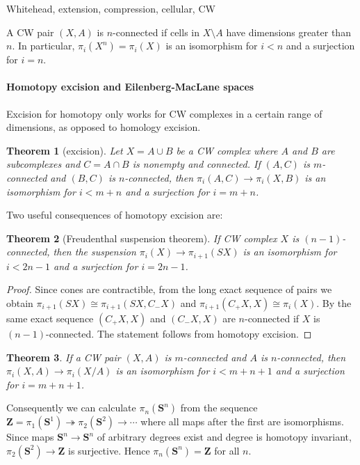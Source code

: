 \documentclass[11pt]{article}
\theoremstyle{definition}
\theoremstyle{plain}
\newtheorem{theorem}{Theorem}[section]
\newcommand{\Z}{\mathbf{Z}}
\newcommand{\1}{\mathbf{1}}
\newcommand{\s}{\mathbf{S}}
\begin{document}
Whitehead, extension, compression, cellular, CW\medbreak

A CW pair $(X,A)$ is $n$-connected if cells in $X\setminus A$ have dimensions greater than $n$. In particular, $\pi_i(X^n)=\pi_i(X)$ is an isomorphism for $i<n$ and a surjection for $i=n$.

\newpage
\paragraph{Homotopy excision and Eilenberg-MacLane spaces} Excision for homotopy only works for CW complexes in a certain range of dimensions, as opposed to homology excision.

\begin{theorem}[excision]
Let $X=A\cup B$ be a CW complex where $A$ and $B$ are subcomplexes and $C=A\cap B$ is nonempty and connected. If $(A,C)$ is $m$-connected and $(B,C)$ is $n$-connected, then $\pi_i(A,C)\to\pi_i(X,B)$ is an isomorphism for $i<m+n$ and a surjection for $i=m+n$.
\end{theorem}

Two useful consequences of homotopy excision are:

\begin{theorem}[Freudenthal suspension theorem]
If CW complex $X$ is $(n-1)$-connected, then the suspension $\pi_i(X)\to\pi_{i+1}(SX)$ is an isomorphism for $i<2n-1$ and a surjection for $i=2n-1$.
\end{theorem}
\begin{proof}
Since cones are contractible, from the long exact sequence of pairs we obtain $\pi_{i+1}(SX)\cong\pi_{i+1}(SX,C_-X)$ and $\pi_{i+1}(C_+X,X)\cong\pi_i(X)$. By the same exact sequence $(C_+X,X)$ and $(C_-X,X)$ are $n$-connected if $X$ is $(n-1)$-connected. The statement follows from homotopy excision.
\end{proof}

\begin{theorem}
If a CW pair $(X,A)$ is $m$-connected and $A$ is $n$-connected, then $\pi_i(X,A)\to\pi_i(X/A)$ is an isomorphism for $i<m+n+1$ and a surjection for $i=m+n+1$.
\end{theorem}

Consequently we can calculate $\pi_n(\s^n)$ from the sequence $\Z=\pi_1(\s^1)\twoheadrightarrow\pi_2(\s^2)\to\cdots$ where all maps after the first are isomorphisms. Since maps $\s^n\to\s^n$ of arbitrary degrees exist and degree is homotopy invariant, $\pi_2(\s^2)\to\Z$ is surjective. Hence $\pi_n(\s^n)=\Z$ for all $n$.\medbreak
\end{document}
